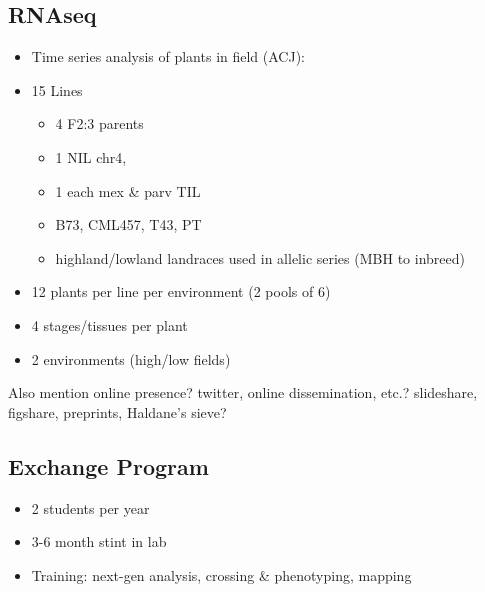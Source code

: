\subsection{RNAseq}
\begin{itemize}
\item Time series analysis of plants in field (ACJ):
\item 15 Lines
\begin{itemize}
\item 4 F2:3 parents
\item 1 NIL chr4,
\item 1 each mex \& parv TIL
\item B73, CML457, T43, PT
\item highland/lowland landraces used in allelic series (MBH to inbreed)
\end{itemize}
\item 12 plants per line per environment (2 pools of 6)
\item 4 stages/tissues per plant
\item 2 environments (high/low fields)
\end{itemize}





\setcounter{section}{1}

Also mention online presence?  twitter, online dissemination, etc.? slideshare, figshare, preprints, Haldane's sieve?

\subsection{Exchange Program} %
\begin{itemize}
\item 2 students per year
\item 3-6 month stint in lab
\item Training: next-gen analysis, crossing \& phenotyping, mapping
\end{itemize}

